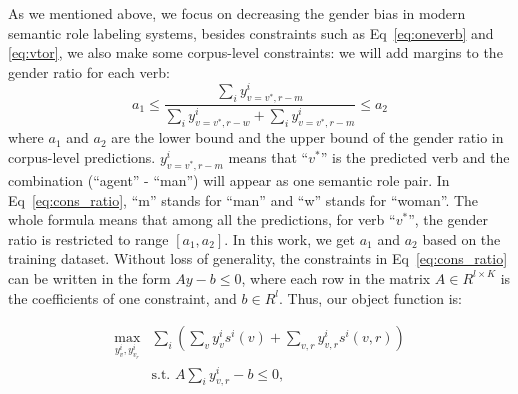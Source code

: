 As we mentioned above, we focus on decreasing the gender bias in modern semantic role labeling systems, besides constraints such as Eq~\eqref{eq:oneverb} and \eqref{eq:vtor}, we also make some corpus-level constraints: we will add  margins to the gender ratio for each verb:
\begin{equation}\label{eq:cons_ratio}
 a_1 \leq \frac{\sum_i y^i_{v = v^*, r - m}}{\sum_i y^i_{v = v^*, r - w} + \sum_i y^i_{v = v^*, r - m}} \leq a_2
\end{equation}
where $a_1$ and $a_2$ are the lower bound and the upper bound of the gender ratio in corpus-level predictions. $y^i_{v = v^*, r- m}$ means that ``$v^*$'' is the predicted verb and the combination (``agent'' - ``man'') will appear as one  semantic role pair. In Eq~\eqref{eq:cons_ratio}, ``m'' stands for ``man'' and ``w'' stands for ``woman''. The whole formula means that among all the predictions, for verb ``$v^*$'', the gender ratio is restricted to range $[a_1, a_2]$. In this work, we get $a_1$ and $a_2$ based on the training dataset. 
Without loss of generality, the constraints in Eq~\eqref{eq:cons_ratio} can be written in the form $Ay - b \leq 0$, where each row in the matrix $A\in R^{l \times K}$ is the coefficients of one constraint, and $b\in R^l$.  Thus, our object function is:

\begin{subequations}
\label{eq:objforlr}
\begin{align}
    \max_{y^i_v, y^i_{v_r}} & {\sum_i (\sum_v  y^i_v s^i(v)+\sum_{v,r}y^i_{v,r}s^i(v,r))} 
    \label{eq:objforlr1} \\        
& \text{s.t. } 
    A\sum_i y_{v,r}^i - b \leq 0, \label{eq:objforlr2}       
\end{align}
\end{subequations}



\fi

